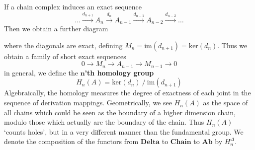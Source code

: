 If a chain complex induces an exact sequence
%
\[ \dots \xrightarrow{d_{n+1}} A_n \xrightarrow{d_n} A_{n-1} \xrightarrow{d_{n-1}} A_{n-2} \xrightarrow{d_{n-2}} \dots \]
%
Then we obtain a further diagram
%
\begin{center}
\end{center}
%
where the diagonals are exact, defining $M_n = \text{im}(d_{n+1}) = \text{ker}(d_n)$. Thus we obtain a family of short exact sequences
%
\[ 0 \to M_n \to A_{n-1} \to M_{n-1} \to 0 \]
%
in general, we define the {\bf $\mathbf{n}$'th homology group}
%
\[ H_n(A) = \text{ker}(d_n)\ /\ \text{im}(d_{n+1}) \]
%
Algebraically, the homology measures the degree of exactness of each joint in the sequence of derivation mappings. Geometrically, we see $H_n(A)$ as the space of all chains which could be seen as the boundary of a higher dimension chain, modulo those which actually are the boundary of the chain. Thus $H_n(A)$ `counts holes', but in a very different manner than the fundamental group. We denote the composition of the functors from $\textbf{Delta}$ to $\textbf{Chain}$ to $\textbf{Ab}$ by $H_n^\Delta$.

